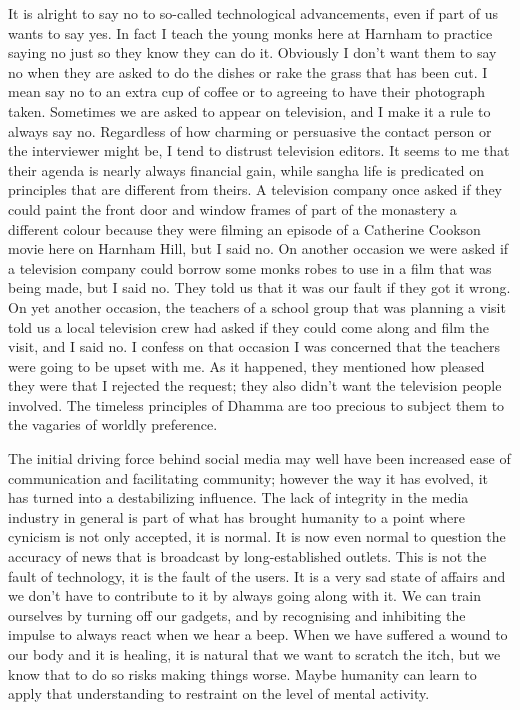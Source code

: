 It is alright to say no to so-called technological advancements, even if
part of us wants to say yes. In fact I teach the young monks here at
Harnham to practice saying no just so they know they can do it.
Obviously I don't want them to say no when they are asked to do the
dishes or rake the grass that has been cut. I mean say no to an extra
cup of coffee or to agreeing to have their photograph taken. Sometimes
we are asked to appear on television, and I make it a rule to always say
no. Regardless of how charming or persuasive the contact person or the
interviewer might be, I tend to distrust television editors. It seems to me that their agenda is nearly always financial gain, while sangha life is
predicated on principles that are different from theirs. A television
company once asked if they could paint the front door and window frames
of part of the monastery a different colour because they were filming an
episode of a Catherine Cookson movie here on Harnham Hill, but I said
no. On another occasion we were asked if a television company could
borrow some monks robes to use in a film that was being made, but I said
no. They told us that it was our fault if they got it wrong. On yet
another occasion, the teachers of a school group that was planning a
visit told us a local television crew had asked if they could come along
and film the visit, and I said no. I confess on that occasion I was
concerned that the teachers were going to be upset with me. As it
happened, they mentioned how pleased they were that I rejected the
request; they also didn't want the television people involved. The
timeless principles of Dhamma are too precious to subject them to the
vagaries of worldly preference.

The initial driving force behind social media may well have been
increased ease of communication and facilitating community; however the
way it has evolved, it has turned into a destabilizing influence. The
lack of integrity in the media industry in general is part of what has
brought humanity to a point where cynicism is not only accepted, it is
normal. It is now even normal to question the accuracy of news that is
broadcast by long-established outlets. This is not the fault of
technology, it is the fault of the users. It is a very sad state of
affairs and we don't have to contribute to it by always going along with
it. We can train ourselves by turning off our gadgets, and by
recognising and inhibiting the impulse to always react when we hear a
beep. When we have suffered a wound to our body and it is healing, it is
natural that we want to scratch the itch, but we know that to do so
risks making things worse. Maybe humanity can learn to apply that
understanding to restraint on the level of mental activity.

